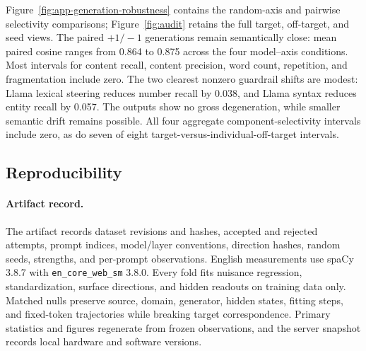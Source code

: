 Figure~\ref{fig:app-generation-robustness} contains the random-axis and pairwise selectivity comparisons; Figure~\ref{fig:audit} retains the full target, off-target, and seed views. The paired \(+1/-1\) generations remain semantically close: mean paired cosine ranges from 0.864 to 0.875 across the four model--axis conditions. Most intervals for content recall, content precision, word count, repetition, and fragmentation include zero. The two clearest nonzero guardrail shifts are modest: Llama lexical steering reduces number recall by 0.038, and Llama syntax reduces entity recall by 0.057. The outputs show no gross degeneration, while smaller semantic drift remains possible. All four aggregate component-selectivity intervals include zero, as do seven of eight target-versus-individual-off-target intervals.

\newpage
\subsection{Reproducibility}
\label{app:compute-evidence}

\paragraph{Artifact record.} The artifact records dataset revisions and hashes, accepted and rejected attempts, prompt indices, model/layer conventions, direction hashes, random seeds, strengths, and per-prompt observations. English measurements use spaCy 3.8.7 with \texttt{en\_core\_web\_sm} 3.8.0. Every fold fits nuisance regression, standardization, surface directions, and hidden readouts on training data only. Matched nulls preserve source, domain, generator, hidden states, fitting steps, and fixed-token trajectories while breaking target correspondence. Primary statistics and figures regenerate from frozen observations, and the server snapshot records local hardware and software versions.

